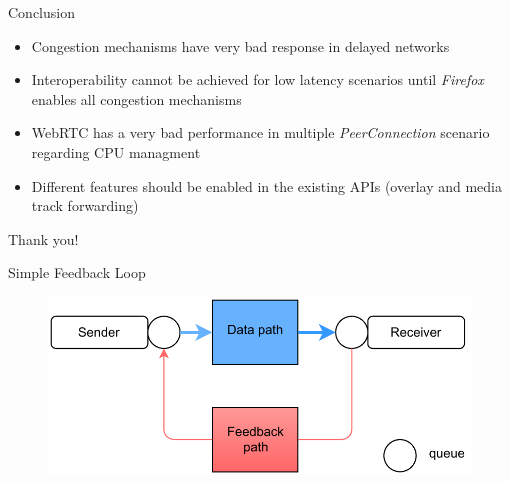 \documentclass[first=red,second=purple,logo=yellowexc]{aaltoslides}
\begin{document}
\begin{frame}{Conclusion}

\begin{itemize}
\item Congestion mechanisms have very bad response in delayed networks
\item Interoperability cannot be achieved for low latency scenarios until {\it Firefox} enables all congestion mechanisms 
\item WebRTC has a very bad performance in multiple {\it PeerConnection} scenario regarding CPU managment
\item Different features should be enabled in the existing APIs (overlay and media track forwarding)
\end{itemize}

\end{frame}
\begin{frame}{}

\centering Thank you!

\end{frame}


\begin{frame}{Simple Feedback Loop}

\begin{figure}[h]
  \centering
  \includegraphics[width=1\textwidth]{simplefeedback.pdf}
\end{figure}
\end{frame}

\end{document}
